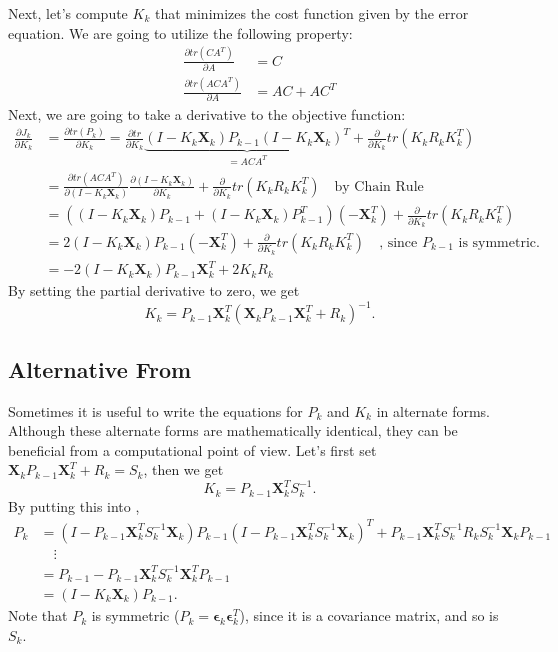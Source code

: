 Next, let's compute $K_k$ that minimizes the cost function given by the error equation. We are going to utilize the following property:
\begin{align*}
	\frac{\partial tr(CA^T)}{\partial A} &= C\\
	\frac{\partial tr(ACA^T)}{\partial A} &= AC + AC^T
\end{align*}
Next, we are going to take a derivative to the objective function:
\begin{align*}
	\frac{\partial J_k}{\partial K_k} &= \frac{\partial tr(P_k)}{\partial K_k} = \frac{\partial tr}{\partial K_k}\underbrace{(I-K_k \mathbf{X}_k)P_{k-1}(I-K_k \mathbf{X}_k)^T}_{=ACA^T}+\frac{\partial}{\partial K_k}tr\left(K_k R_k K_k^T\right)\\ 
									  &= \frac{\partial tr(ACA^T)}{\partial (I-K_k \mathbf{X}_k)}\frac{\partial (I-K_k \mathbf{X}_k)}{\partial K_k} +\frac{\partial}{\partial K_k}tr\left(K_k R_k K_k^T\right) \quad \text{by Chain Rule}\\
	&= \left((I-K_k \mathbf{X}_k)P_{k-1}+ (I-K_k \mathbf{X}_k)P_{k-1}^T\right)(-\mathbf{X}_k^T) + \frac{\partial}{\partial K_k}tr\left(K_k R_k K_k^T\right)\\
	&= 2(I-K_k \mathbf{X}_k)P_{k-1}(-\mathbf{X}_k^T) + \frac{\partial}{\partial K_k}tr\left(K_k R_k K_k^T\right)\quad \text{, since } P_{k-1} \text{ is symmetric.}\\
									  &= -2(I-K_k \mathbf{X}_k)P_{k-1}\mathbf{X}_k^T+2K_kR_k
\end{align*}
By setting the partial derivative to zero, we get
$$K_k = P_{k-1}\mathbf{X}_k^T(\mathbf{X}_kP_{k-1}\mathbf{X}_k^T+R_k)^{-1}.$$

\subsection{Alternative From}
Sometimes it is useful to write the equations for $P_k$ and $K_k$ in alternate forms. Although these alternate forms are mathematically identical, they can be beneficial from a computational point of view. Let's first set $\mathbf{X}_kP_{k-1}\mathbf{X}_k^T+R_k = S_k$, then we get 
$$K_k = P_{k-1}\mathbf{X}_k^TS_k^{-1}.$$
By putting this into ,
\begin{align*}
	P_k &= (I-P_{k-1}\mathbf{X}_k^TS_k^{-1} \mathbf{X}_k)P_{k-1}(I-P_{k-1}\mathbf{X}_k^TS_k^{-1} \mathbf{X}_k)^T+P_{k-1}\mathbf{X}_k^TS_k^{-1} R_k S_k^{-1}\mathbf{X}_kP_{k-1}\\ 
		&\quad \vdots\\
		&= P_{k-1}-P_{k-1}\mathbf{X}_k^TS_k^{-1}\mathbf{X}_k^TP_{k-1}\\
		&= (I-K_k\mathbf{X}_k)P_{k-1}.
\end{align*}
Note that $P_k$ is symmetric (\cf $P_k=\boldsymbol{\epsilon}_{k}\boldsymbol{\epsilon}_{k}^T$), since it is a covariance matrix, and so is $S_k$.

